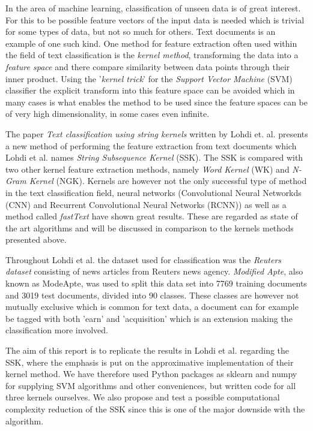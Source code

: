 In the area of machine learning, classification of unseen data is of great interest. For this to be possible feature vectors of the input data is needed which is trivial for some types of data, but not so much for others. Text documents is an example of one such kind. One method for feature extraction often used within the field of text classification is the \textit{kernel method}, transforming the data into a \textit{feature space} and there compare similarity between data points through their inner product. Using the '\textit{kernel trick}' for the \textit{Support Vector Machine} (SVM) classifier the explicit transform into this feature space can be avoided which in many cases is what enables the method to be used since the feature spaces can be of very high dimensionality, in some cases even infinite. 

The paper \textit{Text classification using string kernels} written by Lohdi et. al. presents a new method of performing the feature extraction from text documents which Lohdi et al. names \textit{String Subsequence Kernel} (SSK). The SSK is compared with two other kernel feature extraction methods, namely \textit{Word Kernel} (WK) and \textit{N-Gram Kernel} (NGK). Kernels are however not the only successful type of method in the text classification field, neural networks (Convolutional Neural Networkds (CNN) and Recurrent Convolutional Neural Networks (RCNN)) as well as a method called \textit{fastText} have shown great results. These are regarded as state of the art algorithms and will be discussed in comparison to the kernels methods presented above. 

Throughout Lohdi et al. the dataset used for classification was the \textit{Reuters dataset} consisting of news articles from Reuters news agency. \textit{Modified Apte}, also known as ModeApte, was used to split this data set into 7769 training documents and 3019 test documents, divided into 90 classes. These classes are however not mutually exclusive which is common for text data, a document can for example be tagged with both 'earn' and 'acquisition' which is an extension making the classification more involved.

The aim of this report is to replicate the results in Lohdi et al. regarding the SSK, where the emphasis is put on the approximative implementation of their kernel method. We have therefore used Python packages as sklearn and numpy for supplying SVM algorithms and other conveniences, but written code for all three kernels ourselves. We also propose and test a possible computational complexity reduction of the SSK since this is one of the major downside with the algorithm.
